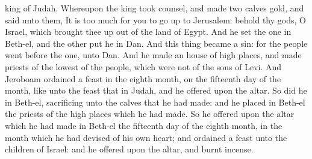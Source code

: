 {king of
Judah.
Whereupon the
king took
counsel, and
made
two
calves
{}
gold, and
said unto them, It is too
much for you to go
up to
Jerusalem: behold thy
gods, O
Israel, which brought thee
up out of the
land of
Egypt.
And he
set the
one in
Beth-el, and the
other
put he in
Dan.
And this
thing became a
sin: for the
people
went
{}
before the
one,
{} unto
Dan.
And he
made an
house of high
places, and
made
priests of the
lowest of the
people, which were not of the
sons of
Levi.
And
Jeroboam
ordained a
feast in the
eighth
month, on the
fifteenth
day of the
month, like unto the
feast that
{} in
Judah, and he
offered upon the
altar. So
did he in
Beth-el,
sacrificing unto the
calves that he had
made: and he
placed in
Beth-el the
priests of the high
places which he had
made.
So he
offered upon the
altar which he had
made in
Beth-el the
fifteenth
day of the
eighth
month,
{} in the
month which he had
devised of his own
heart; and
ordained a
feast unto the
children of
Israel: and he
offered upon the
altar, and burnt
incense.

}
